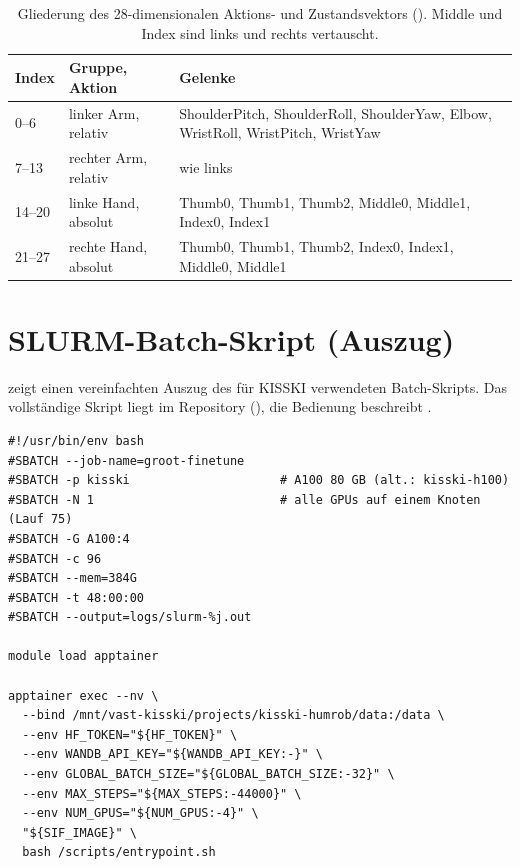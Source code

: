 \begin{table}[htb]
  \centering
  \begin{tabularx}{\linewidth}{llX}
    \toprule
    Index & Gruppe, Aktion & Gelenke \\
    \midrule
    0--6   & linker Arm, relativ  & ShoulderPitch, ShoulderRoll, ShoulderYaw, Elbow, WristRoll, WristPitch, WristYaw \\
    7--13  & rechter Arm, relativ & wie links \\
    14--20 & linke Hand, absolut  & Thumb0, Thumb1, Thumb2, Middle0, Middle1, Index0, Index1 \\
    21--27 & rechte Hand, absolut & Thumb0, Thumb1, Thumb2, Index0, Index1, Middle0, Middle1 \\
    \bottomrule
  \end{tabularx}
  \caption[Gliederung des 28-dimensionalen Aktions- und Zustandsvektors]{Gliederung des 28-dimensionalen Aktions- und Zustandsvektors
    (). Middle und Index sind links und rechts
    vertauscht.}
  \label{tab:anh-aktionsraum}
\end{table}

\chapter{SLURM-Batch-Skript (Auszug)}
\label{anh:slurm}

 zeigt einen vereinfachten Auszug des für KISSKI verwendeten
Batch-Skripts. Das vollständige Skript liegt im Repository
(), die Bedienung beschreibt
.

\begin{listing}[htb]
\begin{verbatim}
#!/usr/bin/env bash
#SBATCH --job-name=groot-finetune
#SBATCH -p kisski                     # A100 80 GB (alt.: kisski-h100)
#SBATCH -N 1                          # alle GPUs auf einem Knoten (Lauf 75)
#SBATCH -G A100:4
#SBATCH -c 96
#SBATCH --mem=384G
#SBATCH -t 48:00:00
#SBATCH --output=logs/slurm-%j.out

module load apptainer

apptainer exec --nv \
  --bind /mnt/vast-kisski/projects/kisski-humrob/data:/data \
  --env HF_TOKEN="${HF_TOKEN}" \
  --env WANDB_API_KEY="${WANDB_API_KEY:-}" \
  --env GLOBAL_BATCH_SIZE="${GLOBAL_BATCH_SIZE:-32}" \
  --env MAX_STEPS="${MAX_STEPS:-44000}" \
  --env NUM_GPUS="${NUM_GPUS:-4}" \
  "${SIF_IMAGE}" \
  bash /scripts/entrypoint.sh
\end{verbatim}
\caption{Vereinfachter Auszug aus \texttt{kisski\_submit.sh}.}
\label{lst:anh-slurm}
\end{listing}

